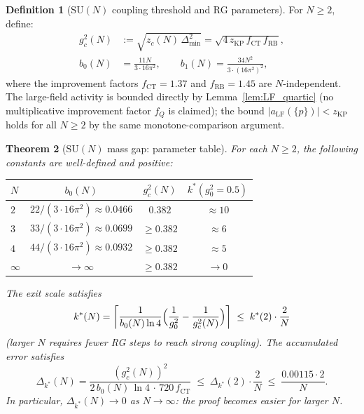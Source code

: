 \documentclass[11pt,a4paper]{amsart}
\newtheorem{theorem}{Theorem}[section]
\theoremstyle{definition}
\newtheorem{definition}[theorem]{Definition}
\newcommand{\SU}{\mathrm{SU}}
\newcommand{\Del}{\Delta_{\min}}
\newcommand{\gB}{g^2_c}
\newcommand{\zKP}{z_{\mathrm{KP}}}
\newcommand{\CT}{\mathrm{CT}}
\begin{document}
\begin{definition}[$\SU(N)$ coupling threshold and RG parameters]
\label{def:SUN_params}
For $N \ge 2$, define:
\begin{align}
  \gB(N)
  &:= \sqrt{z_c(N)\,\Del^2}
   = \sqrt{4\,\zKP\,f_{\CT}\,f_{\mathrm{RB}}},
  \label{eq:gc_N} \\
  b_0(N)
  &= \frac{11N}{3\cdot 16\pi^2},
  \qquad
  b_1(N) = \frac{34N^2}{3\cdot(16\pi^2)^2},
  \label{eq:b01_N}
\end{align}
where the improvement factors $f_{\CT} = 1.37$ and $f_{\mathrm{RB}} = 1.45$
are $N$-independent.  The large-field activity is bounded directly by
Lemma~\ref{lem:LF_quartic} (no multiplicative improvement factor $f_Q$ is
claimed); the bound $|a_{\mathrm{LF}}(\{p\})| < \zKP$ holds for all $N \ge 2$
by the same monotone-comparison argument.
\end{definition}

\begin{theorem}[$\SU(N)$ mass gap: parameter table]
\label{thm:SUN_table}
For each $N \ge 2$, the following constants are well-defined and positive:

\begin{center}
\renewcommand{\arraystretch}{1.35}
\begin{tabular}{lccc}
\hline
$N$ & $b_0(N)$ & $g^2_c(N)$ & $k^*(g^2_0 = 0.5)$ \\
\hline
$2$ & $22/(3\cdot 16\pi^2) \approx 0.0466$ & $0.382$ & $\approx 10$ \\
$3$ & $33/(3\cdot 16\pi^2) \approx 0.0699$ & $\ge 0.382$ & $\approx 6$ \\
$4$ & $44/(3\cdot 16\pi^2) \approx 0.0932$ & $\ge 0.382$ & $\approx 5$ \\
$\infty$ & $\to\infty$ & $\ge 0.382$ & $\to 0$ \\
\hline
\end{tabular}
\end{center}

The exit scale satisfies
\begin{equation}
\label{eq:kstar_N}
  k^*(N) = \left\lceil\frac{1}{b_0(N)\ln 4}\Bigl(\frac{1}{g^2_0}-\frac{1}{\gB(N)}\Bigr)
            \right\rceil
  \;\le\; k^*(2) \cdot \frac{2}{N}
\end{equation}
(larger $N$ requires \emph{fewer} RG steps to reach strong coupling).
The accumulated error satisfies
\begin{equation}
\label{eq:Dkstar_N}
  \Delta_{k^*}(N)
  = \frac{(g^2_c(N))^2}{2\,b_0(N)\,\ln 4\,\cdot\,720\,f_{\CT}}
  \;\le\; \Delta_{k^*}(2) \cdot \frac{2}{N}
  \;\le\; \frac{0.00115\cdot 2}{N}.
\end{equation}
In particular, $\Delta_{k^*}(N) \to 0$ as $N\to\infty$: the proof becomes
\emph{easier} for larger $N$.
\end{theorem}
\end{document}
